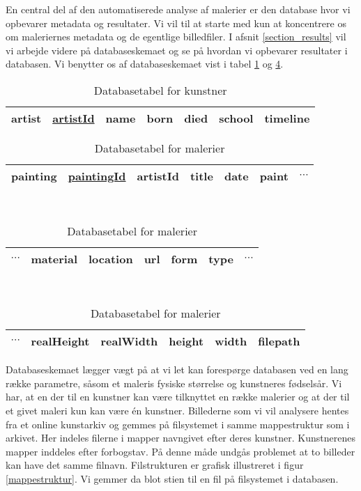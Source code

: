 {
En central del af den automatiserede analyse af malerier er den database
hvor vi opbevarer metadata og resultater. Vi vil til at starte med kun
at koncentrere os om maleriernes metadata og de egentlige billedfiler. I
afsnit \ref{section_results} vil vi arbejde videre på databaseskemaet og
se på hvordan vi opbevarer resultater i databasen.  Vi benytter os af
databaseskemaet vist i tabel \ref{artistTable0} og \ref{paintingTable0}.

\begin{table}[!h]
    \centering
    \begin{tabular}{|l||c|c|c|c|c|c|}
        \hline
        \bf{artist} \hspace{0.5cm} & \underline{artistId} & name & born & died & school & timeline \\\hline
    \end{tabular}
    \caption{Databasetabel for kunstner}
    \label{artistTable0}
\end{table}

\begin{table}[!h]
    \centering
    \begin{tabular}{|l||c|c|c|c|c|c}
        \hline
        \bf{painting} \hspace{0.5cm} & \underline{paintingId} & artistId & title & date & paint & $\cdots$ \\\hline
    \end{tabular}\\ \vspace{0.2cm}\hspace{1.2cm}
    \begin{tabular}{c|c|c|c|c|c|c}
        \hline
        $\cdots$ & material & location & url & form & type & $\cdots$ \\\hline
    \end{tabular}\\ \vspace{0.2cm}\hspace{1.4cm}
    \begin{tabular}{c|c|c|c|c|c|}
        \hline
        $\cdots$ & realHeight & realWidth & height & width & filepath \\\hline
    \end{tabular}
    \caption{Databasetabel for malerier}
    \label{paintingTable0}
\end{table}

Databaseskemaet lægger vægt på at vi let kan forespørge
databasen ved en lang række parametre, såsom et maleris fysiske
størrelse og kunstneres fødselsår. Vi har, at en der til en kunstner
kan være tilknyttet en række malerier og at der til et givet maleri kun
kan være én kunstner. Billederne som vi vil analysere hentes fra et
online kunstarkiv og gemmes på filsystemet i samme mappestruktur som i
arkivet. Her indeles filerne i mapper navngivet efter deres kunstner.
Kunstnerenes mapper inddeles efter forbogstav. På denne måde undgås
problemet at to billeder kan have det samme filnavn. Filstrukturen er
grafisk illustreret i figur \ref{mappestruktur}. Vi gemmer da blot stien
til en fil på filsystemet i databasen.

}
